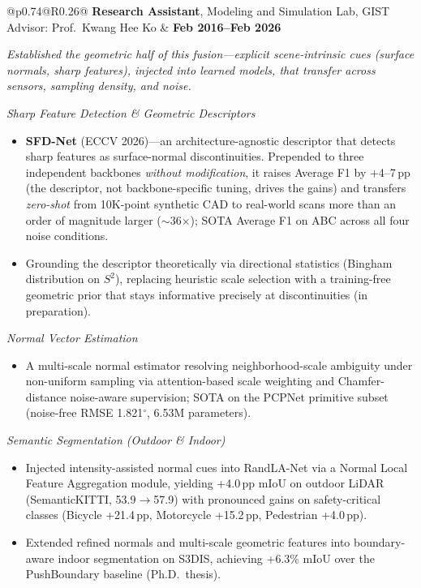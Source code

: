 \documentclass[10pt,a4paper]{article}
\makeatletter
\newcommand{\cvheader}[2]{%
	\begin{tabular*}{\textwidth}{@{}p{0.74\textwidth}@{\extracolsep{\fill}}R{0.26\textwidth}@{}}
		#1 & #2 \\
	\end{tabular*}%
}
\makeatother
\begin{document}
	\vspace{3.0mm}
	\cvheader{\textbf{Research Assistant}, Modeling and Simulation Lab, GIST \textbar{} Advisor: Prof.\ Kwang Hee Ko}{\textbf{Feb 2016--Feb 2026}}
	
	{\small \textit{Established the geometric half of this fusion---explicit scene-intrinsic cues (surface normals, sharp features), injected into learned models, that transfer across sensors, sampling density, and noise.}}
	
	\vspace{2.0mm}
	{\small \textit{Sharp Feature Detection \& Geometric Descriptors}}
	\begin{itemize}[leftmargin=1.8em]
		\item \textbf{SFD-Net} (ECCV 2026)---an architecture-agnostic descriptor that detects sharp features as surface-normal discontinuities. Prepended to three independent backbones \emph{without modification}, it raises Average F1 by +4--7\,pp (the descriptor, not backbone-specific tuning, drives the gains) and transfers \emph{zero-shot} from 10K-point synthetic CAD to real-world scans more than an order of magnitude larger ($\sim$36$\times$); SOTA Average F1 on ABC across all four noise conditions.
		\item Grounding the descriptor theoretically via directional statistics (Bingham distribution on $S^2$), replacing heuristic scale selection with a training-free geometric prior that stays informative precisely at discontinuities (in preparation).
	\end{itemize}
	
	\vspace{0.6mm}
	{\small \textit{Normal Vector Estimation}}
	\begin{itemize}[leftmargin=1.8em]
		\item A multi-scale normal estimator resolving neighborhood-scale ambiguity under non-uniform sampling via attention-based scale weighting and Chamfer-distance noise-aware supervision; SOTA on the PCPNet primitive subset (noise-free RMSE 1.821$^\circ$, 6.53M parameters).
	\end{itemize}
	
	\vspace{0.6mm}
	{\small \textit{Semantic Segmentation (Outdoor \& Indoor)}}
	\begin{itemize}[leftmargin=1.8em]
		\item Injected intensity-assisted normal cues into RandLA-Net via a Normal Local Feature Aggregation module, yielding +4.0\,pp mIoU on outdoor LiDAR (SemanticKITTI, 53.9$\to$57.9) with pronounced gains on safety-critical classes (Bicycle +21.4\,pp, Motorcycle +15.2\,pp, Pedestrian +4.0\,pp).
		\item Extended refined normals and multi-scale geometric features into boundary-aware indoor segmentation on S3DIS, achieving +6.3\% mIoU over the PushBoundary baseline (Ph.D.\ thesis).
	\end{itemize}
	
\end{document}
